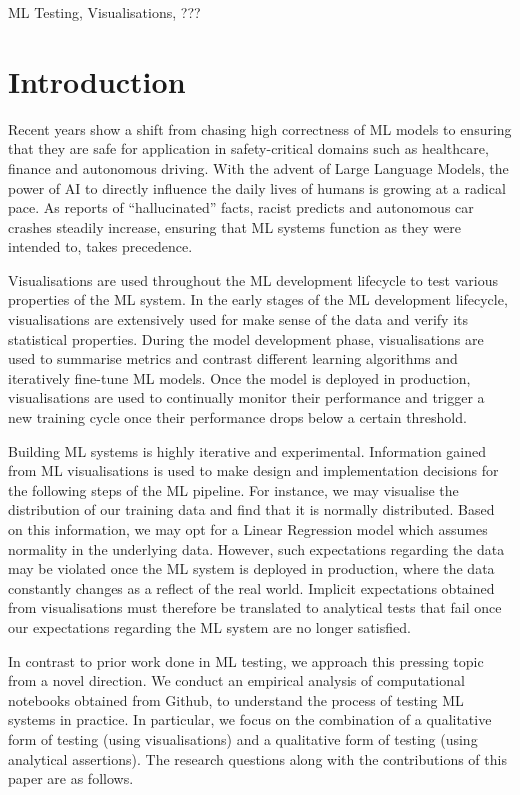 \documentclass[conference]{IEEEtran}
\begin{document}
\begin{IEEEkeywords}
  ML Testing, Visualisations, ???
\end{IEEEkeywords}

\section{Introduction}\label{sec:intro}

Recent years show a shift from chasing high correctness of ML models
to ensuring that they are safe for application in safety-critical
domains such as healthcare, finance and autonomous driving. With the
advent of Large Language Models, the power of AI to directly influence
the daily lives of humans is growing at a radical pace. As reports of
``hallucinated'' facts, racist predicts and autonomous car crashes
steadily increase, ensuring that ML systems function as they were
intended to, takes precedence.

Visualisations are used throughout the ML development lifecycle to
test various properties of the ML system. In the early stages of the
ML development lifecycle, visualisations are extensively used for make
sense of the data and verify its statistical properties. During the
model development phase, visualisations are used to summarise metrics
and contrast different learning algorithms and iteratively fine-tune
ML models. Once the model is deployed in production, visualisations
are used to continually monitor their performance and trigger a new
training cycle once their performance drops below a certain threshold.

Building ML systems is highly iterative and experimental. Information
gained from ML visualisations is used to make design and
implementation decisions for the following steps of the ML
pipeline. For instance, we may visualise the distribution of our
training data and find that it is normally distributed. Based on this
information, we may opt for a Linear Regression model which assumes
normality in the underlying data. However, such expectations regarding
the data may be violated once the ML system is deployed in production,
where the data constantly changes as a reflect of the real
world. Implicit expectations obtained from visualisations must
therefore be translated to analytical tests that fail once our
expectations regarding the ML system are no longer satisfied.

In contrast to prior work done in ML testing, we approach this
pressing topic from a novel direction. We conduct an empirical
analysis of computational notebooks obtained from Github, to
understand the process of testing ML systems in practice. In
particular, we focus on the combination of a qualitative form of
testing (using visualisations) and a qualitative form of testing
(using analytical assertions). The research questions along with the
contributions of this paper are as follows.
\end{document}
